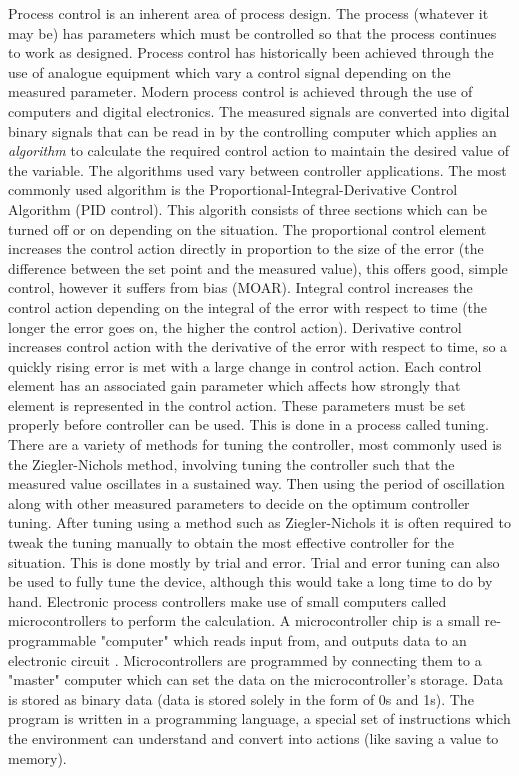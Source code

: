 \documentclass[a4]{report}
\begin{document}
	Process control is an inherent area of process design. The process (whatever it may be) has parameters which must be controlled so that the process continues to work as designed. Process control has historically been achieved through the use of analogue equipment which vary a control signal depending on the measured parameter. Modern process control is achieved through the use of computers and digital electronics. The measured signals are converted into digital binary signals that can be read in by the controlling computer which applies an \textit{algorithm} to calculate the required control action to maintain the desired value of the variable. The algorithms used vary between controller applications. The most commonly used algorithm is the Proportional-Integral-Derivative Control Algorithm (PID control). This algorith consists of three sections which can be turned off or on depending on the situation. The proportional control element increases the control action directly in proportion to the size of the error (the difference between the set point and the measured value), this offers good, simple control, however it suffers from bias (MOAR). Integral control increases the control action depending on the integral of the error with respect to time (the longer the error goes on, the higher the control action). Derivative control increases control action with the derivative of the error with respect to time, so a quickly rising error is met with a large change in control action. \newline \newline \noindent
	Each control element has an associated gain parameter which affects how strongly that element is represented in the control action. These parameters must be set properly before controller can be used. This is done in a process called tuning. There are a variety of methods for tuning the controller, most commonly used is the Ziegler-Nichols method, involving tuning the controller such that the measured value oscillates in a sustained way. Then using the period of oscillation along with other measured parameters to decide on the optimum controller tuning. After tuning using a method such as Ziegler-Nichols it is often required to tweak the tuning manually to obtain the most effective controller for the situation. This is done mostly by trial and error. Trial and error tuning can also be used to fully tune the device, although this would take a long time to do by hand. \newline \newline \noindent
	Electronic process controllers make use of small computers called microcontrollers to perform the calculation. A microcontroller chip is a small re-programmable "computer" which reads input from, and outputs data to an electronic circuit \cite{backwhatismc}. Microcontrollers are programmed by connecting them to a "master" computer which can set the data on the microcontroller's storage. Data is stored as binary data (data is stored solely in the form of 0s and 1s). The program is written in a programming language, a special set of instructions which the environment can understand and convert into actions (like saving a value to memory). \newline \newline \noindent
	
\end{document}
